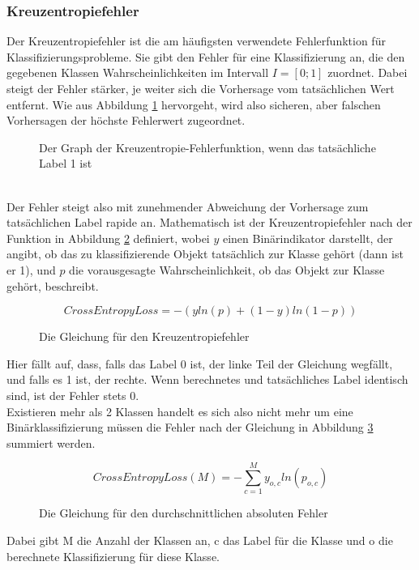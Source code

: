 \documentclass[11pt]{article}
\begin{document}
\subsubsection{Kreuzentropiefehler}
Der Kreuzentropiefehler ist die am häufigsten verwendete Fehlerfunktion für Klassifizierungsprobleme. Sie gibt den Fehler für eine Klassifizierung an, die den gegebenen Klassen Wahrscheinlichkeiten im Intervall $I=[0;1]$ zuordnet. Dabei steigt der Fehler stärker, je weiter sich die Vorhersage vom tatsächlichen Wert entfernt. Wie aus Abbildung \ref{CEL_Graph} hervorgeht, wird also sicheren, aber falschen Vorhersagen der höchste Fehlerwert zugeordnet. 
\begin{figure}[h]
	\begin{center}
	\end{center}
	\caption{Der Graph der Kreuzentropie-Fehlerfunktion, wenn das tatsächliche Label 1 ist}
	\label{CEL_Graph}
\end{figure}
\\
Der Fehler steigt also mit zunehmender Abweichung der Vorhersage zum tatsächlichen Label rapide an.\newline 
Mathematisch ist der Kreuzentropiefehler nach der Funktion in Abbildung \ref{CEL_Function} definiert, wobei $y$ einen Binärindikator darstellt, der angibt, ob das zu klassifizierende Objekt tatsächlich zur Klasse gehört (dann ist er 1), und $p$ die vorausgesagte Wahrscheinlichkeit, ob das Objekt zur Klasse gehört, beschreibt.
\begin{figure}[h]
	\begin{equation*}
	CrossEntropyLoss=-(yln(p)+(1-y)ln(1-p))
	\end{equation*}
	\caption{Die Gleichung für den Kreuzentropiefehler}
	\label{CEL_Function}
\end{figure}
\newline
Hier fällt auf, dass, falls das Label 0 ist, der linke Teil der Gleichung wegfällt, und falls es 1 ist, der rechte. Wenn berechnetes und tatsächliches Label identisch sind, ist der Fehler stets 0.\\
Existieren mehr als 2 Klassen handelt es sich also nicht mehr um eine Binärklassifizierung müssen die Fehler nach der Gleichung in Abbildung \ref{CEL_Function_cummulative} summiert werden.
\begin{figure}[h]
	\begin{equation*}
	CrossEntropyLoss(M)=-\sum\limits_{c=1}^My_{o,c}ln(p_{o,c})
	\end{equation*}
	\caption{Die Gleichung für den durchschnittlichen absoluten Fehler}
	\label{CEL_Function_cummulative}
\end{figure}
\newline
Dabei gibt M die Anzahl der Klassen an, c das Label für die Klasse und o die berechnete Klassifizierung für diese Klasse.
\end{document}

